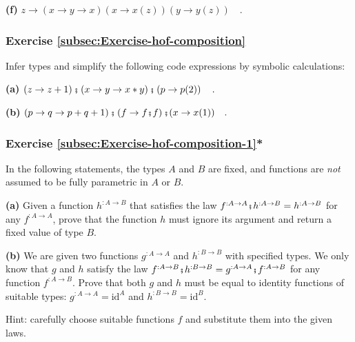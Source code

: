 \textbf{(f)} $z\rightarrow\left(x\rightarrow y\rightarrow x\right)\left(x\rightarrow x(z)\right)(y\rightarrow y(z))\quad.$

\subsubsection{Exercise \label{subsec:Exercise-hof-composition}\ref{subsec:Exercise-hof-composition}}

Infer types and simplify the following code expressions by symbolic
calculations:

\textbf{(a)} $\left(z\rightarrow z+1\right)\bef\left(x\rightarrow y\rightarrow x*y\right)\bef\left(p\rightarrow p(2)\right)\quad.$

\textbf{(b)} $\left(p\rightarrow q\rightarrow p+q+1\right)\bef\left(f\rightarrow f\bef f\right)\bef(x\rightarrow x(1))\quad.$

\subsubsection{Exercise \label{subsec:Exercise-hof-composition-1}\ref{subsec:Exercise-hof-composition-1}{*}}

In the following statements, the types $A$ and $B$ are fixed, and
functions are \emph{not} assumed to be fully parametric in $A$ or
$B$.

\textbf{(a)} Given a function $h^{:A\rightarrow B}$ that satisfies
the law $f^{:A\rightarrow A}\bef h^{:A\rightarrow B}=h^{:A\rightarrow B}$
for any $f^{:A\rightarrow A}$, prove that the function $h$ must
ignore its argument and return a fixed value of type $B$.

\textbf{(b)} We are given two functions $g^{:A\rightarrow A}$ and
$h^{:B\rightarrow B}$ with specified types. We only know that $g$
and $h$ satisfy the law $f^{:A\rightarrow B}\bef h^{:B\rightarrow B}=g^{:A\rightarrow A}\bef f^{:A\rightarrow B}$
for any function $f^{:A\rightarrow B}$. Prove that both $g$ and
$h$ must be equal to identity functions of suitable types: $g^{:A\rightarrow A}=\text{id}^{A}$
and $h^{:B\rightarrow B}=\text{id}^{B}$.

Hint: carefully choose suitable functions $f$ and substitute them
into the given laws.%
\begin{comment}
\textbf{(a)} Choose $f^{:A\rightarrow A}\triangleq\_\rightarrow a$
and compute $x\triangleright f\bef h=h(a)\overset{!}{=}x\triangleright h$.
So, $h(x)$ equals a fixed value $h(a)$. It then follows that the
value $h(a)$ does not depend on $a$ either; so $h(x)$ is a constant
that must be hard-coded in $h$. 

\textbf{(b)} Choose $f^{:A\rightarrow B}\triangleq\_\rightarrow b$
and compute $x\triangleright f\bef h=h(b)\overset{!}{=}x\triangleright g\bef f=x\triangleright g\triangleright f=b$.
It follows that $h(b)=b$ for any $b$, so $h$ is an identity function.
Substitute that into the law and get $f=g\bef f$ for any function
$f$. Substitute the $f\triangleq\text{id}$ into that and derive
$\text{id}=g\bef\text{id}=g$.
\end{comment}



